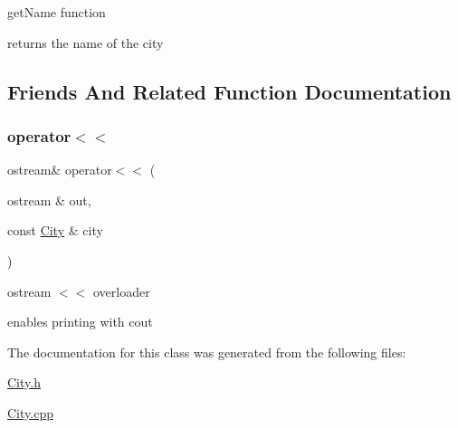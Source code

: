 get\+Name function 

returns the name of the city 

\subsection{Friends And Related Function Documentation}
\hypertarget{class_city_a3d76003bb85bc7dd3f9fd5630287cb77}{}\label{class_city_a3d76003bb85bc7dd3f9fd5630287cb77} 
\subsubsection{\texorpdfstring{operator$<$$<$}{operator<<}}
{\footnotesize\ttfamily ostream\& operator$<$$<$ (\begin{DoxyParamCaption}\item[{ostream \&}]{out,  }\item[{const \hyperlink{class_city}{City} \&}]{city }\end{DoxyParamCaption})\hspace{0.3cm}{\ttfamily [friend]}}



ostream $<$$<$ overloader 

enables printing with cout 

The documentation for this class was generated from the following files\+:\begin{DoxyCompactItemize}
\item 
\hyperlink{_city_8h}{City.\+h}\item 
\hyperlink{_city_8cpp}{City.\+cpp}\end{DoxyCompactItemize}
